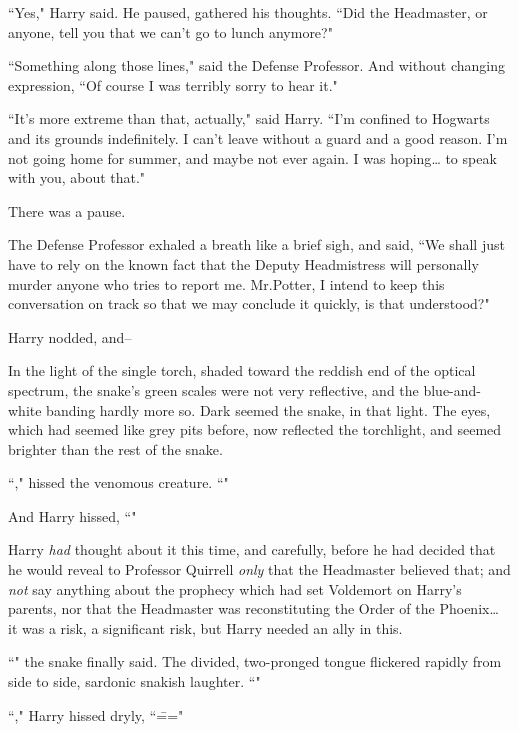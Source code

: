``Yes," Harry said. He paused, gathered his thoughts. ``Did the Headmaster, or anyone, tell you that we can't go to lunch anymore?"

``Something along those lines," said the Defense Professor. And without changing expression, ``Of course I was terribly sorry to hear it."

``It's more extreme than that, actually," said Harry. ``I'm confined to Hogwarts and its grounds indefinitely. I can't leave without a guard and a good reason. I'm not going home for summer, and maybe not ever again. I was hoping{\ldots} to speak with you, about that."

There was a pause.

The Defense Professor exhaled a breath like a brief sigh, and said, ``We shall just have to rely on the known fact that the Deputy Headmistress will personally murder anyone who tries to report me. Mr.\?Potter, I intend to keep this conversation on track so that we may conclude it quickly, is that understood?"

Harry nodded, and\---

In the light of the single torch, shaded toward the reddish end of the optical spectrum, the snake's green scales were not very reflective, and the blue-and-white banding hardly more so. Dark seemed the snake, in that light. The eyes, which had seemed like grey pits before, now reflected the torchlight, and seemed brighter than the rest of the snake.

``," hissed the venomous creature. ``"

And Harry hissed, ``"

Harry \emph{had} thought about it this time, and carefully, before he had decided that he would reveal to Professor Quirrell \emph{only} that the Headmaster believed that; and \emph{not} say anything about the prophecy which had set Voldemort on Harry's parents, nor that the Headmaster was reconstituting the Order of the Phoenix{\ldots} it was a risk, a significant risk, but Harry needed an ally in this.

``" the snake finally said. The divided, two-pronged tongue flickered rapidly from side to side, sardonic snakish laughter. ``"

``," Harry hissed dryly, ``\==="

